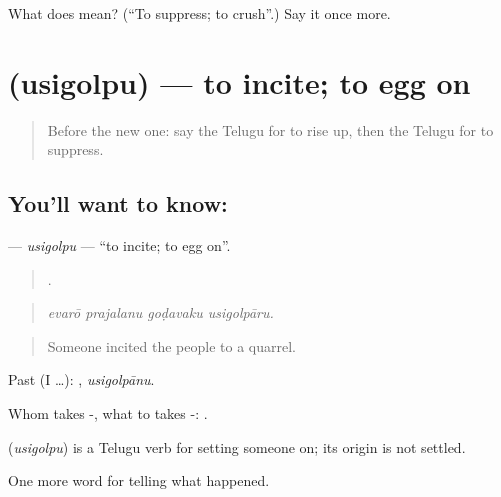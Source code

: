 \begin{tcolorbox}[breakable,colback=teal!4,colframe=teal!35!black,title={Before you move on}]
What does  mean? (\textquotedblleft{}To suppress; to crush\textquotedblright{}.) Say it once more.
\end{tcolorbox}
\section[\texorpdfstring{\te{ఉసిగొల్పు} (usigolpu)}{ఉసిగొల్పు (usigolpu)}]{ (usigolpu) — to incite; to egg on}

\label{lesson:TE-C363-usigolpu}



\begin{quote}
Before the new one: say the Telugu for to rise up, then the Telugu for to suppress.
\end{quote}

\subsection*{You'll want to know: }
\textbf{} — \emph{usigolpu} — \textquotedblleft{}to incite; to egg on\textquotedblright{}.

\begin{quote}
   .
\end{quote}

\begin{quote}
\emph{evarō prajalanu goḍavaku usigolpāru.}
\end{quote}

\begin{quote}
Someone incited the people to a quarrel.
\end{quote}

Past (I …): , \emph{usigolpānu}.

Whom takes -, what to takes -:  .

\begin{cousinweb}
\textbf{} (\emph{usigolpu}) is a Telugu verb for setting someone on; its origin is not settled.
\end{cousinweb}

\begin{grammarlens}[title={What you've built}]
One more word for telling what happened.
\end{grammarlens}

